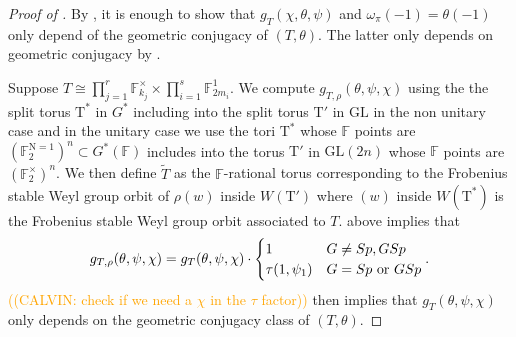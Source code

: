 \documentclass[12pt, reqno]{amsart}
\theoremstyle{definition}
\theoremstyle{definition}
\theoremstyle{definition}
\newcommand{\multiplicativegroup}[1]{#1^{\times}}
\newcommand{\GL}{\mathrm{GL}}
\newcommand{\aFieldNorm}{\mathrm{N}}
\newcommand{\finiteField}{\mathbb{F}}
\newcommand{\finiteFieldExtension}[1]{\finiteField_{#1}}
\newcommand{\NormOneGroup}[1]{\finiteFieldExtension{#1}^{\aFieldNorm = 1}}
\newcommand{\algebraicGroup}[1]{\boldsymbol{\mathrm{#1}}}
\newcommand{\calvin}[1]{\textcolor{orange}{\sffamily ((CALVIN: #1))}}
\begin{document}
\begin{proof}[Proof of ] 
By , it is enough to show that $g_{T}(\chi,\theta,\psi)$ and $\omega_{\pi}(-1) = \theta(-1)$ only depend of the geometric conjugacy of $(T,\theta)$. The latter only depends on geometric conjugacy by .

Suppose $T \cong \prod_{j=1}^r \multiplicativegroup{\finiteFieldExtension{k_j}} \times \prod_{i=1}^s \finiteFieldExtension{2m_i}^1$. We compute $g_{T,\rho}(\theta,\psi,\chi)$ using the the split torus $\algebraicGroup{T}^*$ in $G^*$ including into the split torus $\algebraicGroup{T}'$ in $\GL$ in the non unitary case and in the unitary case we use the tori $\algebraicGroup{T}^*$ whose $\finiteField$ points are $(\NormOneGroup{2})^n \subset G^*(\finiteField)$ includes into the torus $\algebraicGroup{T}'$ in $\GL(2n)$ whose $\finiteField$ points are $(\finiteFieldExtension{2}^\times)^n$. We then define $\tilde{T}$ as the $\finiteField$-rational torus corresponding to the Frobenius stable Weyl group orbit of $\rho(w)$ inside $W(\algebraicGroup{T}')$ where $(w)$ inside $W(\algebraicGroup{T}^*)$ is the Frobenius stable Weyl group orbit associated to $T$.  above implies that
\[
g_{T,\rho}(\theta,\psi,\chi)= g_{T}(\theta,\psi,\chi) \cdot \begin{cases}
        1  & G \neq Sp, GSp\\
        \tau(1,\psi_1) & G = Sp \textnormal{ or } GSp
    \end{cases}.
\]
\calvin{check if we need a $\chi$ in the $\tau$ factor}
 then implies that $g_T(\theta,\psi,\chi)$ only depends on the geometric conjugacy class of $(T,\theta)$.   
\begin{comment}
We will have to treat the unitary group case seperatedly. First for the non-unitary group case:\\




\end{comment}
\end{proof}
\end{document}
